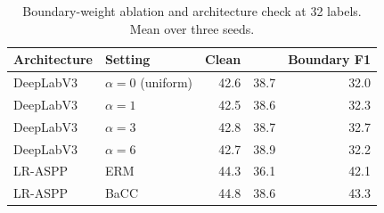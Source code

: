 \begin{table}[t]
\centering
\caption{Boundary-weight ablation and architecture check at 32 labels. Mean over three seeds.}
\label{tab:ablation}
\small
\begin{tabular}{llrrr}
\toprule Architecture & Setting & Clean & \miouc{} & Boundary F1 \\
\midrule
DeepLabV3 & $\alpha=0$ (uniform) & 42.6 & 38.7 & 32.0 \\
DeepLabV3 & $\alpha=1$ & 42.5 & 38.6 & 32.3 \\
DeepLabV3 & $\alpha=3$ & 42.8 & 38.7 & 32.7 \\
DeepLabV3 & $\alpha=6$ & 42.7 & 38.9 & 32.2 \\
\midrule
LR-ASPP & ERM & 44.3 & 36.1 & 42.1 \\
LR-ASPP & BaCC & 44.8 & 38.6 & 43.3 \\
\bottomrule
\end{tabular}
\end{table}
